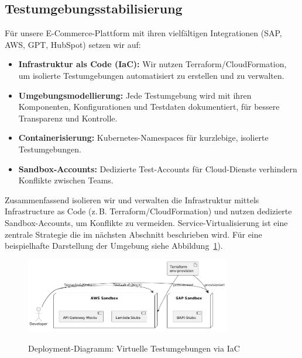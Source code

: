 \subsection{Testumgebungsstabilisierung}
Für unsere E-Commerce-Plattform mit ihren vielfältigen Integrationen (SAP, AWS, GPT, HubSpot) setzen wir auf:
\begin{itemize}
    \item \textbf{Infrastruktur als Code (IaC):} Wir nutzen Terraform/CloudFormation, um isolierte
    Testumgebungen automatisiert zu erstellen und zu verwalten.
    \item \textbf{Umgebungsmodellierung:} Jede Testumgebung wird mit ihren Komponenten,
    Konfigurationen und Testdaten dokumentiert, für bessere Transparenz und Kontrolle.
    \item \textbf{Containerisierung:} Kubernetes-Namespaces für kurzlebige, isolierte Testumgebungen.
    \item \textbf{Sandbox-Accounts:} Dedizierte Test-Accounts für Cloud-Dienste verhindern
    Konflikte zwischen Teams.
\end{itemize}

Zusammenfassend isolieren wir und verwalten die Infrastruktur mittels Infrastructure as Code
(z.\,B. Terraform/CloudFormation) und nutzen dedizierte Sandbox-Accounts, um Konflikte zu vermeiden.
Service-Virtualisierung ist eine zentrale Strategie die im nächsten Abschnitt beschrieben wird.
Für eine beispielhafte Darstellung der Umgebung siehe Abbildung~\ref{fig:deployment}).

\begin{figure}[h!]
\centering
\caption{Deployment-Diagramm: Virtuelle Testumgebungen via IaC}
    \includegraphics[width=0.8\textwidth]{fig/stubing.png}
    \label{fig:deployment}
\end{figure}

